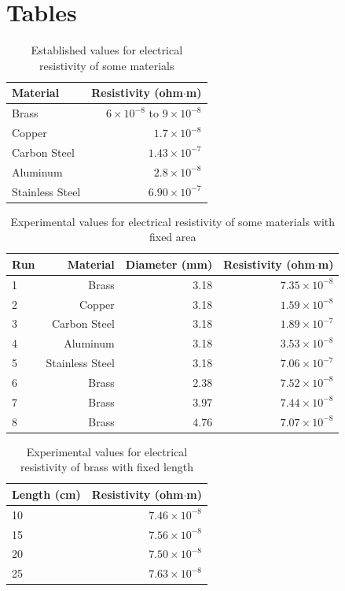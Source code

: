 \section{Tables}
\begin{table}[ht]
	\centering
	\begin{tabular}{|l|r|}
		\hline
		Material & Resistivity (ohm$\cdot$m) \\
		\hline
		Brass & $6 \times 10^{-8}$ to $9 \times 10^{-8}$ \\
		Copper & $1.7 \times 10^{-8}$ \\
		Carbon Steel & $1.43 \times 10^{-7}$ \\
		Aluminum & $2.8 \times 10^{-8}$ \\
		Stainless Steel & $6.90 \times 10^{-7}$ \\
		\hline
	\end{tabular}
	\caption{Established values for electrical resistivity of some materials}
	\label{table.02.established}
\end{table}
\begin{table}[ht]
	\centering
	\begin{tabular}{|l|r|r|r|}
		\hline
		Run & Material & Diameter (mm) & Resistivity (ohm$\cdot$m) \\
		\hline
		1 & Brass & 3.18 & $7.35 \times 10^{-8}$ \\
		2 & Copper & 3.18 & $1.59 \times 10^{-8}$ \\
		3 & Carbon Steel & 3.18 & $1.89 \times 10^{-7}$ \\
		4 & Aluminum & 3.18 & $3.53 \times 10^{-8}$ \\
		5 & Stainless Steel & 3.18 & $7.06 \times 10^{-7}$ \\
		6 & Brass & 2.38 & $7.52 \times 10^{-8}$ \\
		7 & Brass & 3.97 & $7.44 \times 10^{-8}$ \\
		8 & Brass & 4.76 & $7.07 \times 10^{-8}$ \\
		\hline
	\end{tabular}
	\caption{Experimental values for electrical resistivity of some materials with fixed area}
	\label{table.02.experimental.area}
\end{table}
\begin{table}[ht]
	\centering
	\begin{tabular}{|l|r|}
		\hline
		Length (cm) & Resistivity (ohm$\cdot$m) \\
		\hline
		10 & $7.46 \times 10^{-8}$ \\
		15 & $7.56 \times 10^{-8}$ \\
		20 & $7.50 \times 10^{-8}$ \\
		25 & $7.63 \times 10^{-8}$ \\
		\hline
	\end{tabular}
	\caption{Experimental values for electrical resistivity of brass with fixed length}
	\label{table.02.experimental.length}
\end{table}
\FloatBarrier
\newpage
